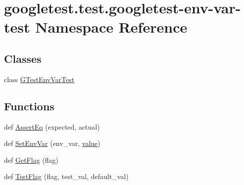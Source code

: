\hypertarget{namespacegoogletest_1_1test_1_1googletest-env-var-test}{}\section{googletest.\+test.\+googletest-\/env-\/var-\/test Namespace Reference}
\label{namespacegoogletest_1_1test_1_1googletest-env-var-test}
\subsection*{Classes}
\begin{DoxyCompactItemize}
\item 
class \mbox{\hyperlink{classgoogletest_1_1test_1_1googletest-env-var-test_1_1_g_test_env_var_test}{G\+Test\+Env\+Var\+Test}}
\end{DoxyCompactItemize}
\subsection*{Functions}
\begin{DoxyCompactItemize}
\item 
def \mbox{\hyperlink{namespacegoogletest_1_1test_1_1googletest-env-var-test_aff12ee67219f21b80f07df97cc307fc9}{Assert\+Eq}} (expected, actual)
\item 
def \mbox{\hyperlink{namespacegoogletest_1_1test_1_1googletest-env-var-test_ae1f6f06e8deee945363c503c36be2bda}{Set\+Env\+Var}} (env\+\_\+var, \mbox{\hyperlink{_obj__test_2lib_2googletest-master_2googlemock_2test_2gmock-matchers__test_8cc_a337b8a670efc0b086ad3af163f3121b6}{value}})
\item 
def \mbox{\hyperlink{namespacegoogletest_1_1test_1_1googletest-env-var-test_abbfc988143774ad9606da3f707f140eb}{Get\+Flag}} (flag)
\item 
def \mbox{\hyperlink{namespacegoogletest_1_1test_1_1googletest-env-var-test_a191e7254c4271f145f0806856fbfbf5b}{Test\+Flag}} (flag, test\+\_\+val, default\+\_\+val)
\end{DoxyCompactItemize}
